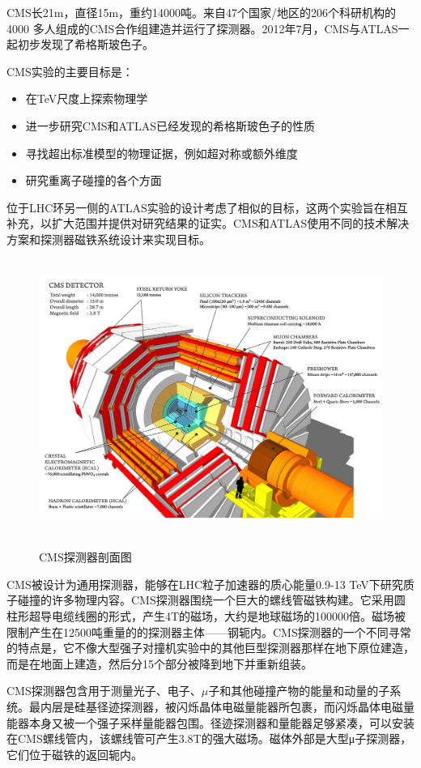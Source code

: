 CMS长21m，直径15m，重约14000吨。来自47个国家/地区的206个科研机构的4000 多人组成的CMS合作组建造并运行了探测器。2012年7月，CMS与ATLAS一起初步发现了希格斯玻色子。

CMS实验的主要目标是：
\begin{itemize}
    \item 在TeV尺度上探索物理学
    \item 进一步研究CMS和ATLAS已经发现的希格斯玻色子的性质
    \item 寻找超出标准模型的物理证据，例如超对称或额外维度
    \item 研究重离子碰撞的各个方面
\end{itemize}

位于LHC环另一侧的ATLAS实验的设计考虑了相似的目标，这两个实验旨在相互补充，以扩大范围并提供对研究结果的证实。CMS和ATLAS使用不同的技术解决方案和探测器磁铁系统设计来实现目标。



\begin{figure}[H]
 \centering
 \caption{CMS探测器剖面图}
 \includegraphics[height=9cm, width=13cm]{pictures/CMS_detector.png}
 \label{fig:1.5}
\end{figure}

CMS被设计为通用探测器，能够在LHC粒子加速器的质心能量0.9-13 TeV下研究质子碰撞的许多物理内容。CMS探测器围绕一个巨大的螺线管磁铁构建。它采用圆柱形超导电缆线圈的形式，产生4T的磁场，大约是地球磁场的100000倍。磁场被限制产生在12500吨重量的的探测器主体——钢轭内。CMS探测器的一个不同寻常的特点是，它不像大型强子对撞机实验中的其他巨型探测器那样在地下原位建造，而是在地面上建造，然后分15个部分被降到地下并重新组装。

CMS探测器包含用于测量光子、电子、$\mu$子和其他碰撞产物的能量和动量的子系统。最内层是硅基径迹探测器，被闪烁晶体电磁量能器所包裹，而闪烁晶体电磁量能器本身又被一个强子采样量能器包围。径迹探测器和量能器足够紧凑，可以安装在CMS螺线管内，该螺线管可产生3.8T的强大磁场。磁体外部是大型μ子探测器，它们位于磁铁的返回轭内。